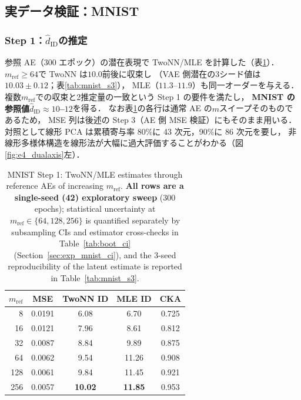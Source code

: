 \documentclass[11pt,a4paper]{jsarticle}
\newcommand{\hatdID}{\hat{d}_{\mathrm{ID}}}
\begin{document}
\subsection{実データ検証：MNIST}\label{sec:exp_mnist}

\subsubsection{Step 1：$\hatdID$の推定}

参照 AE（300 エポック）の潜在表現で TwoNN/MLE を計算した（表\ref{tab:mnist_s1}）．
$m_{\mathrm{ref}} \geq 64$で TwoNN は$10.0$前後に収束し
（VAE 側潜在の3シード値は$10.03 \pm 0.12$；表\ref{tab:mnist_s3}），
MLE（$11.3$--$11.9$）も同一オーダーを与える．
複数$m_{\mathrm{ref}}$での収束と2推定量の一致という Step 1 の要件を満たし，
\textbf{MNIST の参照値$\hatdID \approx 10$--$12$}を得る．
なお表\ref{tab:mnist_s1}の各行は通常 AE の$m$スイープそのものであるため，
MSE 列は後述の Step 3（AE 側 MSE 検証）にもそのまま用いる．
対照として線形 PCA は累積寄与率 80\%に 43 次元，90\%に 86 次元を要し，
非線形多様体構造を線形法が大幅に過大評価することがわかる（図\ref{fig:e4_dualaxis}左）．

\begin{table}[H]
\centering
\caption{MNIST Step 1: TwoNN/MLE estimates through reference AEs of
increasing $m_{\mathrm{ref}}$. \textbf{All rows are a single-seed (42)
exploratory sweep} (300 epochs); statistical uncertainty at
$m_{\mathrm{ref}} \in \{64, 128, 256\}$ is quantified separately by
subsampling CIs and estimator cross-checks in
Table~\ref{tab:boot_ci} (Section~\ref{sec:exp_mnist_ci}), and the 3-seed
reproducibility of the latent estimate is reported in
Table~\ref{tab:mnist_s3}.}
\label{tab:mnist_s1}
\small
\begin{tabular}{rcccc}
\toprule
$m_{\mathrm{ref}}$ & MSE & TwoNN ID & MLE ID & CKA \\
\midrule
8   & 0.0191 & 6.08 & 6.70 & 0.725 \\
16  & 0.0121 & 7.96 & 8.61 & 0.812 \\
32  & 0.0087 & 8.84 & 9.89 & 0.875 \\
64  & 0.0062 & 9.54 & 11.26 & 0.908 \\
128 & 0.0061 & 9.84 & 11.45 & 0.921 \\
256 & 0.0057 & \textbf{10.02} & \textbf{11.85} & 0.953 \\
\bottomrule
\end{tabular}
\end{table}
\end{document}
